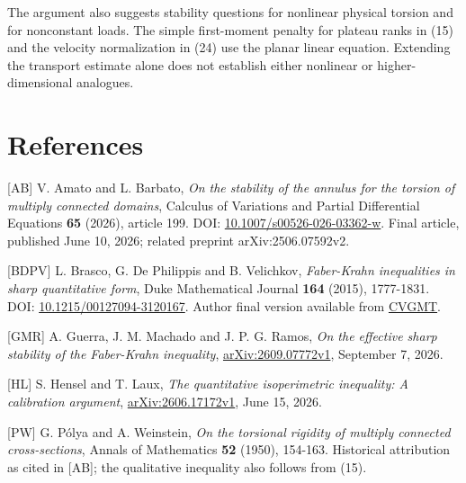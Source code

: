 \documentclass[11pt]{article}
\begin{document}
The argument also suggests stability questions for nonlinear physical
torsion and for nonconstant loads. The simple first-moment penalty for
plateau ranks in (15) and the velocity normalization in (24) use the
planar linear equation. Extending the transport estimate alone does not
establish either nonlinear or higher-dimensional analogues.

\raggedright{}\section{References}\label{references}

{[}AB{]} V. Amato and L. Barbato, \emph{On the stability of the annulus
for the torsion of multiply connected domains}, Calculus of Variations
and Partial Differential Equations \textbf{65} (2026), article 199. DOI:
\href{https://doi.org/10.1007/s00526-026-03362-w}{10.1007/s00526-026-03362-w}.
Final article, published June 10, 2026; related preprint
arXiv:2506.07592v2.

{[}BDPV{]} L. Brasco, G. De Philippis and B. Velichkov,
\emph{Faber-Krahn inequalities in sharp quantitative form}, Duke
Mathematical Journal \textbf{164} (2015), 1777-1831. DOI:
\href{https://doi.org/10.1215/00127094-3120167}{10.1215/00127094-3120167}.
Author final version available from
\href{https://cvgmt.sns.it/paper/2161/}{CVGMT}.

{[}GMR{]} A. Guerra, J. M. Machado and J. P. G. Ramos, \emph{On the
effective sharp stability of the Faber-Krahn inequality},
\href{https://arxiv.org/abs/2609.07772v1}{arXiv:2609.07772v1}, September
7, 2026.

{[}HL{]} S. Hensel and T. Laux, \emph{The quantitative isoperimetric
inequality: A calibration argument},
\href{https://arxiv.org/abs/2606.17172v1}{arXiv:2606.17172v1}, June 15,
2026.

{[}PW{]} G. Pólya and A. Weinstein, \emph{On the torsional rigidity of
multiply connected cross-sections}, Annals of Mathematics \textbf{52}
(1950), 154-163. Historical attribution as cited in {[}AB{]}; the
qualitative inequality also follows from (15).
\end{document}
